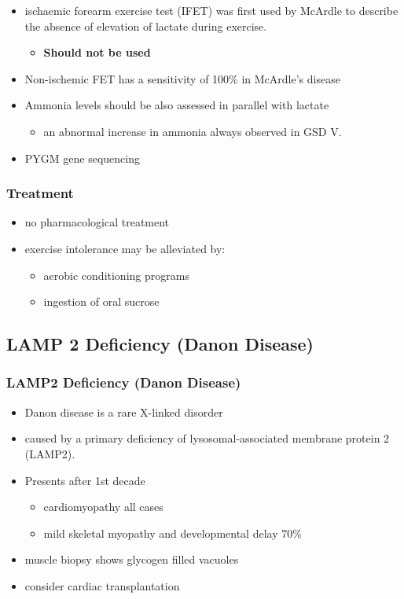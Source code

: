 \documentclass{scrartcl}
\begin{document}
\begin{itemize}
\item ischaemic forearm exercise test (IFET) was first used by McArdle to
describe the absence of elevation of lactate during exercise.
\begin{itemize}
\item \textbf{Should not be used}
\end{itemize}

\item Non-ischemic FET has a sensitivity of 100\% in McArdle’s disease
\item Ammonia levels should be also assessed in parallel with lactate
\begin{itemize}
\item an abnormal increase in ammonia always observed in GSD V.
\end{itemize}
\item PYGM gene sequencing
\end{itemize}

\subsubsection{Treatment}
\label{sec:org9312308}
\begin{itemize}
\item no pharmacological treatment
\item exercise intolerance may be alleviated by:
\begin{itemize}
\item aerobic conditioning programs
\item ingestion of oral sucrose
\end{itemize}
\end{itemize}
\subsection{LAMP 2 Deficiency (Danon Disease)}
\label{sec:orge082552}
\subsubsection{LAMP2 Deficiency (Danon Disease)}
\label{sec:orgb6b032f}
\begin{itemize}
\item Danon disease is a rare X-linked disorder
\item caused by a primary deficiency of lysosomal-associated membrane
protein 2 (LAMP2).
\item Presents after 1st decade
\begin{itemize}
\item cardiomyopathy all cases
\item mild skeletal myopathy and developmental delay 70\%
\end{itemize}
\item muscle biopsy shows glycogen filled vacuoles
\item consider cardiac transplantation
\end{itemize}
\end{document}
